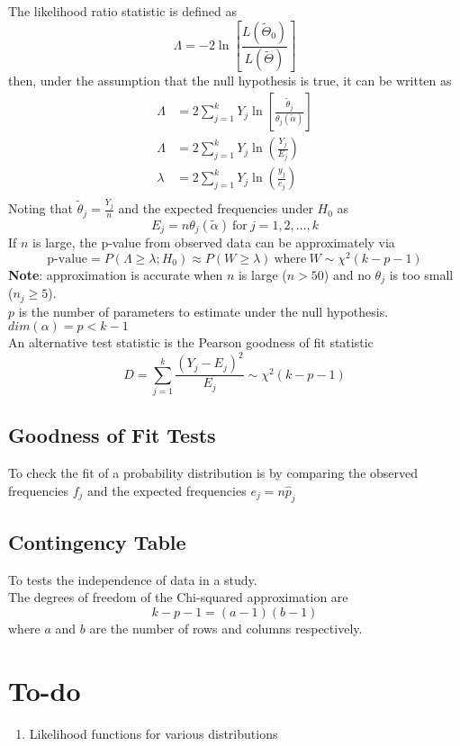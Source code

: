 \documentclass[12pt, leqno]{article}
\theoremstyle{definition}
\begin{document}
  The likelihood ratio statistic is defined as
  $$\Lambda = -2\ln\left[\frac{L(\widetilde{\Theta}_{0})}{L(\widetilde{\Theta})}\right]$$
  then, under the assumption that the null hypothesis is true, it can be written as
  \begin{align*}
    \Lambda &= 2\sum_{j=1}^{k}
    Y_{j}\ln\left[\frac{\widetilde{\theta}_{j}}{\theta_{j}(\widetilde{\alpha})}\right] \\
    \Lambda &= 2\sum_{j=1}^{k}Y_{j}\ln\left(\frac{Y_{j}}{E_{j}}\right) \\
    \lambda &= 2\sum_{j=1}^{k}Y_{j}\ln\left(\frac{y_{j}}{e_{j}}\right) \\
  \end{align*}
  Noting that $\widetilde{\theta}_{j} = \frac{Y_{j}}{n}$ and the expected frequencies under $H_0$ as
  $$E_{j} = n\theta_{j}(\widetilde{\alpha}) ~\text{for}~j=1, 2, \dots, k$$
  If $n$ is large, the p-value from observed data can be approximately via
  \[
  \text{p-value} = P(\Lambda \geq \lambda; H_{0}) \approx P(W \geq \lambda)
  ~\text{where}~ W \sim \chi^{2}(k - p - 1)
  \]
  \textbf{Note}: approximation is accurate when $n$ is large ($n > 50$) and no $\theta_{j}$ is too small ($n_{j} \geq 5$). \\
  $p$ is the number of parameters to estimate under the null hypothesis. \\
  $dim(\alpha) = p < k - 1$ \\

  An alternative test statistic is the Pearson goodness of fit statistic
  $$D = \sum_{j=1}^{k}\frac{(Y_{j} - E_{j})^{2}}{E_{j}} \sim \chi^{2}(k - p - 1)$$

  \subsection{Goodness of Fit Tests}
  To check the fit of a probability distribution is by comparing the observed frequencies $f_{j}$ and the expected frequencies $e_{j} = n\hat{p}_{j}$

  \subsection{Contingency Table}
  To tests the independence of data in a study. \\

  The degrees of freedom of the Chi-squared approximation are
  $$k - p - 1 = (a - 1)(b - 1)$$
  where $a$ and $b$ are the number of rows and columns respectively.

  \newpage
  \section{To-do}
  \begin{enumerate}
    \item Likelihood functions for various distributions
  \end{enumerate}
\end{document}
